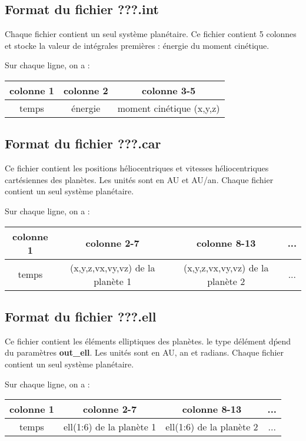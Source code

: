 \documentclass[11pt]{article}
\begin{document}
\subsection{Format du fichier {\bf ???.int} }

Chaque fichier contient un seul syst\`eme plan\'etaire.
Ce fichier contient 5 colonnes et stocke la valeur de int\'egrales premi\`eres  : \'energie du moment cin\'etique.

Sur chaque ligne, on a : 

\begin{tabular}{|c|c|c|} \hline
colonne 1 &  colonne 2 & colonne 3-5 \\ \hline
temps & \'energie & moment cin\'etique (x,y,z)\\    \hline
\end{tabular}


\subsection{Format du fichier {\bf ???.car} }

Ce fichier contient les positions h\'eliocentriques et vitesses h\'eliocentriques cart\'esiennes des plan\`etes. Les unit\'es sont en AU et AU/an.
Chaque fichier contient un seul syst\`eme plan\'etaire.


Sur chaque ligne, on a : 

\begin{tabular}{|c|c|c|c|} \hline
colonne 1 &   colonne 2-7 & colonne 8-13 & ... \\ \hline
temps & (x,y,z,vx,vy,vz) de la plan\`ete 1  & (x,y,z,vx,vy,vz) de la plan\`ete 2 & ... \\    \hline
\end{tabular}

\subsection{Format du fichier {\bf ???.ell} }

Ce fichier contient les \'el\'ements elliptiques des plan\`etes. le type d\'el\'ement d\'pend du param\`etres  {\bf out\_ell}. Les unit\'es sont en AU, an et radians.
Chaque fichier contient un seul syst\`eme plan\'etaire.

Sur chaque ligne, on a : 

\begin{tabular}{|c|c|c|c|} \hline
colonne 1 &   colonne 2-7 & colonne 8-13 & ... \\ \hline
temps & ell(1:6) de la plan\`ete 1  & ell(1:6) de la plan\`ete 2 & ... \\    \hline
\end{tabular}
\end{document}
